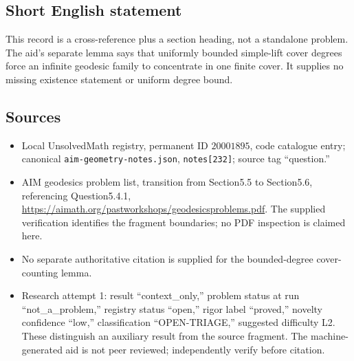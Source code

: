 \documentclass[11pt]{article}
\begin{document}
\subsection{Short English statement}
This record is a cross-reference plus a section heading, not a standalone problem. The aid's separate lemma says that uniformly bounded simple-lift cover degrees force an infinite geodesic family to concentrate in one finite cover. It supplies no missing existence statement or uniform degree bound.
\subsection{Sources}
\begin{itemize}
\item Local UnsolvedMath registry, permanent ID \(20001895\), code catalogue entry; canonical \texttt{aim-geometry-notes.json}, \texttt{notes[232]}; source tag ``question.''
\item AIM geodesics problem list, transition from Section5.5 to Section5.6, referencing Question5.4.1, \url{https://aimath.org/pastworkshops/geodesicsproblems.pdf}. The supplied verification identifies the fragment boundaries; no PDF inspection is claimed here.
\item No separate authoritative citation is supplied for the bounded-degree cover-counting lemma.
\item Research attempt 1: result ``context\_only,'' problem status at run ``not\_a\_problem,'' registry status ``open,'' rigor label ``proved,'' novelty confidence ``low,'' classification ``OPEN-TRIAGE,'' suggested difficulty L2. These distinguish an auxiliary result from the source fragment. The machine-generated aid is not peer reviewed; independently verify before citation.
\end{itemize}
\end{document}
